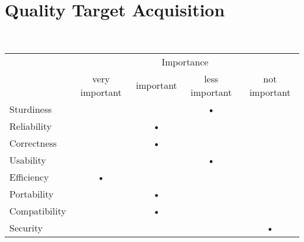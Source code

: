 \section{Quality Target Acquisition}

~\\

\begin{center}
	
	\begin{tabular}{lcccc}
		
		\cline{2-5}
		& \multicolumn{4}{c}{Importance} \\
		\cline{2-5}
			 & very important & important & less important & not important \\
		\hline \hline
		
		\multicolumn{1}{l||}{Sturdiness} & & &\textbf{•} & \\ \hline
		\multicolumn{1}{l||}{Reliability} & &\textbf{•} & &  \\ \hline
		\multicolumn{1}{l||}{Correctness} & & \textbf{•}& &  \\ \hline
		\multicolumn{1}{l||}{Usability} & & &\textbf{•} &  \\ \hline
		\multicolumn{1}{l||}{Efficiency} &\textbf{•} & & &  \\ \hline
		\multicolumn{1}{l||}{Portability} & &\textbf{•} & &  \\ \hline
		\multicolumn{1}{l||}{Compatibility} & & \textbf{•}& &  \\ \hline
		\multicolumn{1}{l||}{Security} & & & & \textbf{•} \\ 
		
		\hline \hline
	
	\end{tabular}
	
\end{center}